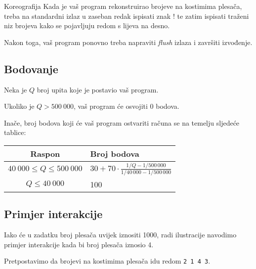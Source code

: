 \begin{statement}[
  problempoints=100,
  timelimit=1 sekunda,
  memorylimit=512 MiB,
]{Koreografija}
Kada je vaš program rekonstruirao brojeve na kostimima plesača, treba na standardni izlaz 
u zaseban redak ispisati znak $\texttt{!}$ te zatim 
ispisati traženi niz brojeva kako se pojavljuju redom s lijeva na desno. 

Nakon toga,
vaš program ponovno treba napraviti \textit{flush} izlaza i završiti
izvođenje.


\subsection*{Bodovanje}

Neka je $Q$ broj upita koje je postavio vaš program.

Ukoliko je $Q > 500~000$, vaš program će osvojiti 0 bodova.

Inače, broj bodova koji će vaš program ostvariti računa se na temelju sljedeće tablice:

{\renewcommand{\arraystretch}{1.4}
  \setlength{\tabcolsep}{6pt}
  \begin{tabular}{cl}
   Raspon & Broj bodova  \\ \midrule
    $40~000 \leq Q \leq 500~000$ & $30 + 70 \cdot 
    \frac{1/Q - 1/500\,000}{1/40\,000 - 1/500\,000}$ \\
    $Q \leq 40~000$ & 100 \\
\end{tabular}}

\newpage
\subsection*{Primjer interakcije}
Iako će u zadatku broj plesača uvijek iznositi 1000, radi ilustracije navodimo primjer 
interakcije kada bi broj plesača iznosio 4. 

Pretpostavimo da brojevi na kostimima plesača idu redom \texttt{2 1 4 3}.


\end{statement}
